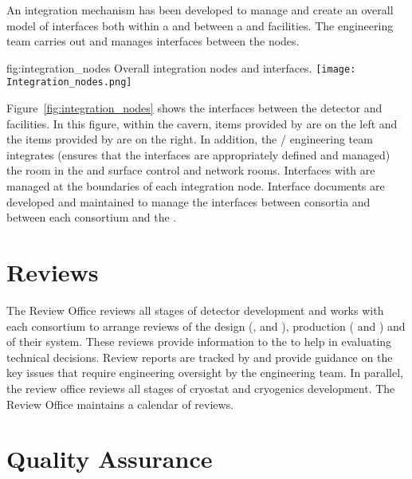  An integration mechanism has been developed to manage and create an overall model of interfaces both within a  and between a  and facilities.
 The  engineering team carries out  and manages interfaces between the nodes.

\begin{dunefigure}{fig:integration_nodes}
  {Overall integration nodes and interfaces.}
  \texttt{[image: Integration\_nodes.png]}
\end{dunefigure}

Figure~\ref{fig:integration_nodes} shows the interfaces between the
detector and facilities. In this figure, within the cavern, items
provided by  are on the left and the items provided by
 are on the right. 
In addition, the / engineering
team integrates (ensures that the interfaces are appropriately defined
and managed) the  room in the  and surface
control and network rooms. Interfaces with 
are managed at the boundaries of each integration node. 
Interface documents are developed and maintained to manage the
interfaces between consortia and between each consortium and the
.


\section{Reviews}
\label{sec:es-tc-reviews}

The   Review Office reviews all stages of
detector development and works with each consortium to arrange reviews
of the design (,  and ), production
( and ) and  of their system. These
reviews provide information to the  to help in evaluating
technical decisions.  Review reports are tracked by  and
provide guidance on the key issues that require engineering oversight
by the  engineering team. In parallel, the review office
reviews all stages of  cryostat and cryogenics
development. The Review Office maintains a calendar of 
reviews.

\section{Quality Assurance}
\label{sec:es-tc-qa}

